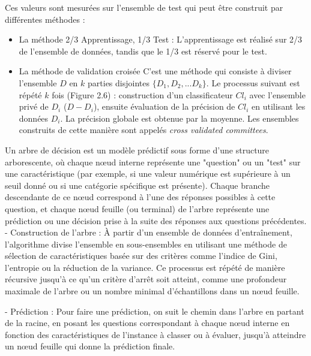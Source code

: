 \documentclass[a4paper,14pt]{article}
\begin{document}
        Ces valeurs sont mesurées sur l'ensemble de test qui peut être construit par différentes méthodes :

         \begin{itemize}
            \item  {La méthode 2/3 Apprentissage, 1/3 Test} :  L'apprentissage est réalisé sur 2/3 de l'ensemble de données, tandis que le 1/3 est réservé pour le test.
            \item  {La méthode de validation croisée}   C'est une méthode qui consiste à diviser l'ensemble $D$ en $k$ parties disjointes $\{D_1, D_2, ... D_k\}$. Le processus suivant est répété $k$ fois (Figure 2.6) : construction d'un classificateur $Cl_i$ avec l'ensemble privé de $D_i$ ($D - D_i$), ensuite évaluation de la précision de $Cl_i$ en utilisant les données $D_i$. La précision globale est obtenue par la moyenne. Les ensembles construits de cette manière sont appelés \textit{cross validated committees}.
        \end{itemize}
  


            Un arbre de décision est un modèle prédictif sous forme d'une structure arborescente, où chaque nœud interne représente une "question" ou un "test" sur une caractéristique (par exemple, si une valeur numérique est supérieure à un seuil donné ou si une catégorie spécifique est présente). Chaque branche descendante de ce nœud correspond à l'une des réponses possibles à cette question, et chaque nœud feuille (ou terminal) de l'arbre représente une prédiction ou une décision prise à la suite des réponses aux questions précédentes. 
            - Construction de l'arbre : À partir d'un ensemble de données d'entraînement, l'algorithme divise l'ensemble en sous-ensembles en utilisant une méthode de sélection de caractéristiques basée sur des critères comme l'indice de Gini, l'entropie ou la réduction de la variance. Ce processus est répété de manière récursive jusqu'à ce qu'un critère d'arrêt soit atteint, comme une profondeur maximale de l'arbre ou un nombre minimal d'échantillons dans un nœud feuille.
            
            - Prédiction : Pour faire une prédiction, on suit le chemin dans l'arbre en partant de la racine, en posant les questions correspondant à chaque nœud interne en fonction des caractéristiques de l'instance à classer ou à évaluer, jusqu'à atteindre un nœud feuille qui donne la prédiction finale.
            
\end{document}
